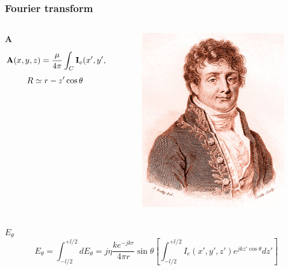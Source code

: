\documentclass[compress=true]{beamer}
\begin{document}
\begin{frame}
\frametitle{Fourier transform}
\begin{columns}
\begin{column}{0.7\textwidth}
\begin{block}{\bf A}
$$
{\bf A}(x,y,z)=\frac{\mu}{4\pi}\int_C{\bf I}_e(x',y',z')\frac{e^{-jkR}}{R}dl'$$
$${\tiny{R\simeq r-z'\cos{\theta}}}$$
\end{block}
\end{column}
\begin{column}{0.3\textwidth}
  \begin{figure}
    \includegraphics[height=0.3\textheight]{Fourier.jpg}
  \end{figure}
\end{column}
\end{columns}
\begin{block}{$E_{\theta}$}
$$E_{\theta}=\int_{-l/2}^{+l/2}dE_{\theta}=j\eta\frac{ke^{-jkr}}{4\pi r}\sin{\theta}[\int_{-l/2}^{+l/2}I_{e}(x',y',z')e^{jkz'\cos{\theta}}dz']$$
\end{block}
\end{frame}
\end{document}
